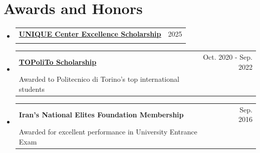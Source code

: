 \documentclass[a4paper,11pt]{article}
\makeatletter
\newcommand{\CVSubheading}[4]{
  \vspace{-2pt}\item
    \begin{tabular*}{0.97\textwidth}[t]{l@{\extracolsep{\fill}}r}
      \textbf{#1} & #2 \\
      \small#3 & \small #4 \\
    \end{tabular*}\vspace{-7pt}
}
\newcommand{\CVSubHeadingListStart}{\begin{itemize}[leftmargin=0.5cm, label={}]}
\newcommand{\CVSubHeadingListEnd}{\end{itemize}}
\makeatother
\begin{document}

\section{Awards and Honors}
  \CVSubHeadingListStart
    \CVSubheading
    {\href{https://www.unique.quebec/2025-unique-excellence-scholarships}{\underline{\small{UNIQUE Center Excellence Scholarship}}}}{\small{2025}}
      {\small{}}{}
      \CVSubheading
      {\href{https://international.polito.it/financial_aid/topolito_scholarships}{\underline{\small{TOPoliTo Scholarship}}}}{\small{Oct. 2020 - Sep. 2022}}
      {\small{Awarded to Politecnico di Torino's top international students}}{}
      \CVSubheading
      {\small{Iran's National Elites Foundation Membership}}{\small{Sep. 2016}}
      {\small{Awarded for excellent performance in University Entrance Exam}}{}
  \CVSubHeadingListEnd    
    


%  


%

%

  
\end{document}
